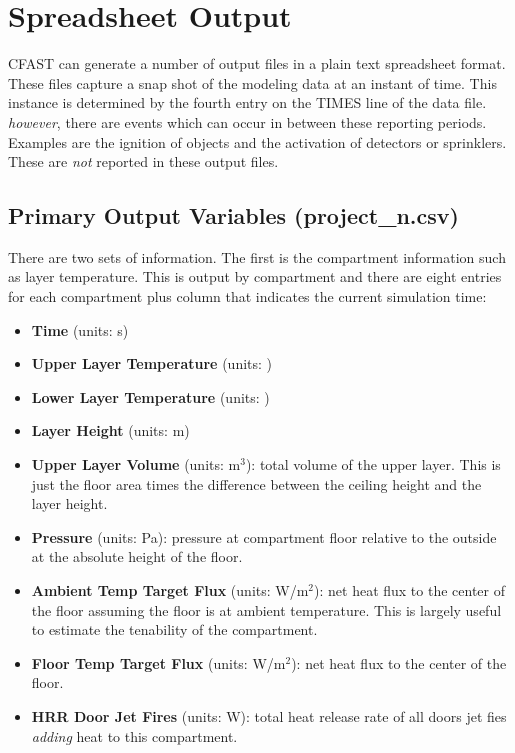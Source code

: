\section{Spreadsheet Output}

CFAST can generate a number of output files in a plain text spreadsheet format.  These files capture a snap shot of the modeling data at an instant of time. This instance is determined by the fourth entry on the TIMES line of the data file. \emph{however}, there are events which can occur in between these reporting periods. Examples are the ignition of objects and the activation of detectors or sprinklers. These are \emph{not} reported in these output files.

\subsection{Primary Output Variables (project\_n.csv)}

There are two sets of information. The first is the compartment information such as layer temperature. This is output by compartment and there are eight entries for each compartment plus column that indicates the current simulation time:

\begin{itemize}
\item \textbf{Time} (units: s)
\item \textbf{Upper Layer Temperature} (units: \degc)
\item \textbf{Lower Layer Temperature} (units: \degc)
\item \textbf{Layer Height}  (units: m)
\item\textbf{ Upper Layer Volume} (units: m$^3$): total volume of the upper layer. This is just the floor area times the difference between the ceiling height and the layer height.
\item\textbf{ Pressure} (units: Pa): pressure at compartment floor relative to the outside at the absolute height of the floor.
\item \textbf{Ambient Temp Target Flux} (units: W/m$^2$): net heat flux to the center of the floor assuming the floor is at ambient temperature.  This is largely useful to estimate the tenability of the compartment.
\item \textbf{Floor Temp Target Flux} (units: W/m$^2$): net heat flux to the center of the floor.
\item \textbf{HRR Door Jet Fires} (units: W): total heat release rate of all doors jet fies \emph{adding} heat to this compartment.
\end{itemize}

